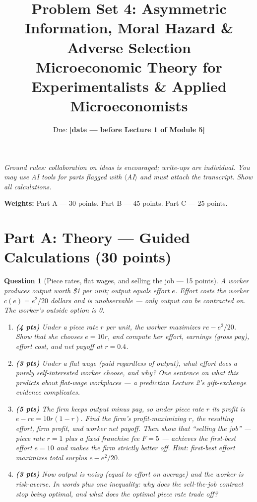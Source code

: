 \documentclass[11pt]{article}
\title{Problem Set 4: Asymmetric Information, Moral Hazard \& Adverse
Selection\\
\large Microeconomic Theory for Experimentalists \& Applied Microeconomists}
\author{Due: \textbf{[date --- before Lecture 1 of Module 5]}}
\date{}
\newtheorem{question}{Question}
\begin{document}
\maketitle

\noindent\emph{Ground rules: collaboration on ideas is encouraged; write-ups
are individual. You may use AI tools for parts flagged with
$\langle$AI$\rangle$ and must attach the transcript. Show all calculations.}

\medskip

\noindent\textbf{Weights:} Part A --- 30 points. Part B --- 45 points.
Part C --- 25 points.

\bigskip

\section*{Part A: Theory --- Guided Calculations (30 points)}

\begin{question}[Piece rates, flat wages, and selling the job --- 15
points]
A worker produces output worth \$1 per unit; output equals effort $e$.
Effort costs the worker $c(e) = e^2/20$ dollars and is \emph{unobservable}
--- only output can be contracted on. The worker's outside option is 0.

\begin{enumerate}[label=(\alph*)]
  \item \textbf{(4 pts)} Under a piece rate $r$ per unit, the worker
        maximizes $r e - e^2/20$. Show that she chooses $e = 10r$, and
        compute her effort, earnings (gross pay), effort cost, and net
        payoff at $r = 0.4$.
  \item \textbf{(3 pts)} Under a flat wage (paid regardless of output),
        what effort does a purely self-interested worker choose, and why?
        One sentence on what this predicts about flat-wage workplaces ---
        a prediction Lecture 2's gift-exchange evidence complicates.
  \item \textbf{(5 pts)} The firm keeps output minus pay, so under piece
        rate $r$ its profit is $e - re = 10r(1 - r)$. Find the firm's
        profit-maximizing $r$, the resulting effort, firm profit, and
        worker net payoff. Then show that ``selling the job'' --- piece
        rate $r = 1$ plus a fixed franchise fee $F = 5$ --- achieves the
        first-best effort $e = 10$ and makes the firm strictly better
        off. \emph{Hint: first-best effort maximizes total surplus
        $e - e^2/20$.}
  \item \textbf{(3 pts)} Now output is noisy (equal to effort on average)
        and the worker is risk-averse. In words plus one inequality:
        why does the sell-the-job contract stop being optimal, and what
        does the optimal piece rate trade off?
\end{enumerate}
\end{question}
\end{document}
